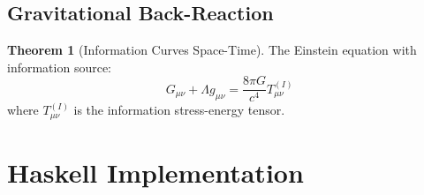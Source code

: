 \documentclass[11pt,a4paper]{article}
\theoremstyle{definition}
\newtheorem{theorem}{Theorem}[section]
\begin{document}
\subsection{Gravitational Back-Reaction}

\begin{theorem}[Information Curves Space-Time]
The Einstein equation with information source:
\begin{equation}
G_{\mu\nu} + \Lambda g_{\mu\nu} = \frac{8\pi G}{c^4} T^{(I)}_{\mu\nu}
\end{equation}
where $T^{(I)}_{\mu\nu}$ is the information stress-energy tensor.
\end{theorem}

\section{Haskell Implementation}
\end{document}
